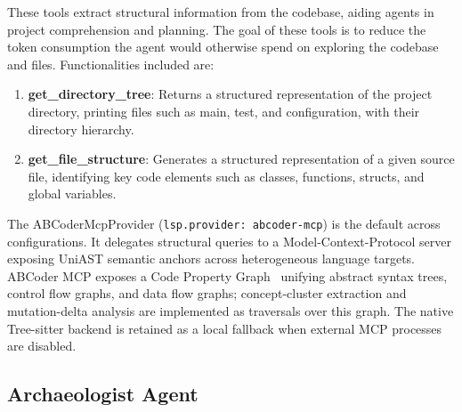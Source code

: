 These tools extract structural information from the codebase, aiding
agents in project comprehension and planning. The goal of these tools
is to reduce the token consumption the agent would otherwise spend on
exploring the codebase and files. Functionalities included are:

\begin{enumerate}
    \item \textbf{get\_directory\_tree}: Returns a structured
    representation of the project directory, printing files such as
    main, test, and configuration, with their directory hierarchy.
    \item \textbf{get\_file\_structure}: Generates a structured
    representation of a given source file, identifying key code
    elements such as classes, functions, structs, and global
    variables.
\end{enumerate}

The ABCoderMcpProvider (\texttt{lsp.provider: abcoder-mcp}) is the
default across configurations. It delegates structural queries to a
Model-Context-Protocol server exposing UniAST semantic anchors across
heterogeneous language targets. ABCoder MCP exposes a Code Property
Graph~\cite{p72_yamaguchi_cpg_2014} unifying abstract syntax trees,
control flow graphs, and data flow graphs; concept-cluster extraction
and mutation-delta analysis are implemented as traversals over this
graph. The native Tree-sitter backend is retained as a local fallback when external MCP processes are disabled.

\subsection{Archaeologist Agent}
\label{sec:method_archaeologist}

